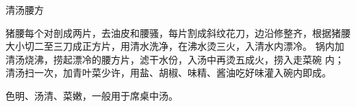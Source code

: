 \begin{recipe}{清汤腰方}

\ingredients


\cooking

\step 猪腰每个对剖成两片，去油皮和腰骚，每片割成斜纹花刀，边沿修整齐，根据猪腰
大小切二至三刀成正方片，用清水洗净，在沸水烫三火，入清水内漂冷。
\step 锅内加清汤烧沸，捞起漂冷的腰方片，滤干水份，入汤中再烫五成火，捞入走菜碗
内；清汤扫一次，加青叶菜少许，用盐、胡椒、味精、酱油吃好味灌入碗内即成。

\features

色明、汤清、菜嫩，一般用于席桌中汤。

\end{recipe}

